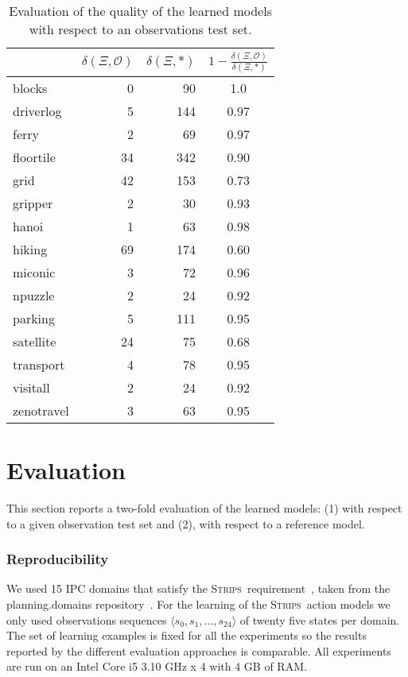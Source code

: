 \documentclass{article}
\newcommand{\tup}[1]{{\langle #1 \rangle}}
\newcommand{\strips}{\textsc{Strips}}     %
\begin{document}
\begin{table}
		\begin{center}
                \begin{footnotesize}
			\begin{tabular}{l|r|r|c|}
				& $\delta(\Xi,\mathcal{O})$ & $\delta(\Xi,*)$ & $1-\frac{\delta(\Xi,\mathcal{O})}{\delta(\Xi,*)}$ \\
				\hline
				blocks & 0 & 90 & 1.0 \\
				driverlog & 5 & 144 & 0.97 \\
				ferry & 2 & 69 & 0.97 \\
				floortile & 34 & 342 & 0.90 \\
				grid & 42 & 153 & 0.73 \\
				gripper & 2 & 30 & 0.93 \\
				hanoi & 1 & 63 & 0.98 \\
				hiking & 69 & 174 & 0.60 \\
				miconic & 3 & 72 & 0.96 \\
				npuzzle & 2 & 24 & 0.92 \\
				parking & 5 & 111 & 0.95 \\
				satellite & 24 & 75 & 0.68 \\
				transport & 4 & 78 & 0.95 \\
				visitall & 2 & 24 & 0.92 \\
				zenotravel & 3 & 63 & 0.95
			\end{tabular}
                        	\end{footnotesize}
		\end{center}
	\caption{\small Evaluation of the quality of the learned models with respect to an observations test set.}
	\label{fig:observationstest}
\end{table}

\section{Evaluation}
This section reports a two-fold evaluation of the learned models: (1) with respect to a given observation test set and (2), with respect to a reference model.

\subsubsection{Reproducibility}
We used 15 IPC domains that satisfy the \strips\ requirement~\cite{fox2003pddl2}, taken from the {\sc planning.domains} repository~\cite{muise2016planning}. For the learning of the \strips\ action models we only used observations sequences $\tup{s_0, s_1, \ldots, s_{24}}$ of twenty five states per domain. The set of learning examples is fixed for all the experiments so the results reported by the different evaluation approaches is comparable. All experiments are run on an Intel Core i5 3.10 GHz x 4 with 4 GB of RAM.
\end{document}
